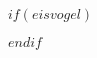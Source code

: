 $if(eisvogel)$
\usepackage{xpatch}
\xpretocmd{\frontmatter}{\customtitlebackpage}{}{}
\xapptocmd{\frontmatter}{\setcounter{page}{3}}{}{}
$endif$

